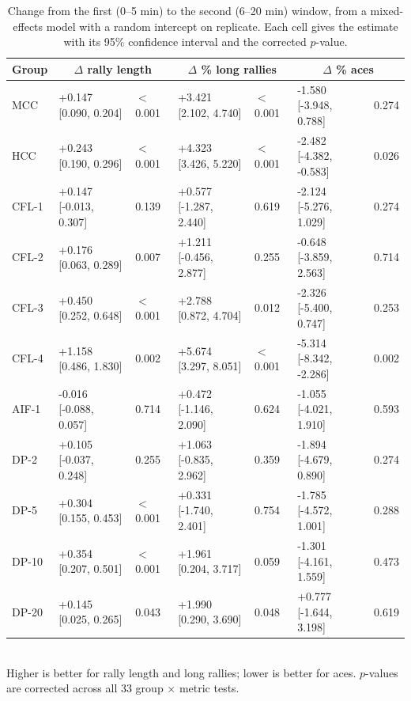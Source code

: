 \begin{table}[ht]
\centering
\small
\caption{Change from the first (0--5 min) to the second (6--20 min) window, from a mixed-effects model with a random intercept on replicate. Each cell gives the estimate with its 95\% confidence interval and the corrected $p$-value.}
\label{tab:within}
\begin{tabular}{lllllll}
\toprule
Group & \multicolumn{2}{c}{$\Delta$ rally length} & \multicolumn{2}{c}{$\Delta$ \% long rallies} & \multicolumn{2}{c}{$\Delta$ \% aces} \\
\midrule
MCC & +0.147 [0.090, 0.204] & $<$0.001 & +3.421 [2.102, 4.740] & $<$0.001 & -1.580 [-3.948, 0.788] & 0.274 \\
HCC & +0.243 [0.190, 0.296] & $<$0.001 & +4.323 [3.426, 5.220] & $<$0.001 & -2.482 [-4.382, -0.583] & 0.026 \\
CFL-1 & +0.147 [-0.013, 0.307] & 0.139 & +0.577 [-1.287, 2.440] & 0.619 & -2.124 [-5.276, 1.029] & 0.274 \\
CFL-2 & +0.176 [0.063, 0.289] & 0.007 & +1.211 [-0.456, 2.877] & 0.255 & -0.648 [-3.859, 2.563] & 0.714 \\
CFL-3 & +0.450 [0.252, 0.648] & $<$0.001 & +2.788 [0.872, 4.704] & 0.012 & -2.326 [-5.400, 0.747] & 0.253 \\
CFL-4 & +1.158 [0.486, 1.830] & 0.002 & +5.674 [3.297, 8.051] & $<$0.001 & -5.314 [-8.342, -2.286] & 0.002 \\
AIF-1 & -0.016 [-0.088, 0.057] & 0.714 & +0.472 [-1.146, 2.090] & 0.624 & -1.055 [-4.021, 1.910] & 0.593 \\
DP-2 & +0.105 [-0.037, 0.248] & 0.255 & +1.063 [-0.835, 2.962] & 0.359 & -1.894 [-4.679, 0.890] & 0.274 \\
DP-5 & +0.304 [0.155, 0.453] & $<$0.001 & +0.331 [-1.740, 2.401] & 0.754 & -1.785 [-4.572, 1.001] & 0.288 \\
DP-10 & +0.354 [0.207, 0.501] & $<$0.001 & +1.961 [0.204, 3.717] & 0.059 & -1.301 [-4.161, 1.559] & 0.473 \\
DP-20 & +0.145 [0.025, 0.265] & 0.043 & +1.990 [0.290, 3.690] & 0.048 & +0.777 [-1.644, 3.198] & 0.619 \\
\bottomrule
\end{tabular}
\\[4pt]\footnotesize{Higher is better for rally length and long rallies; lower is better for aces. $p$-values are corrected across all 33 group $\times$ metric tests.}
\end{table}
